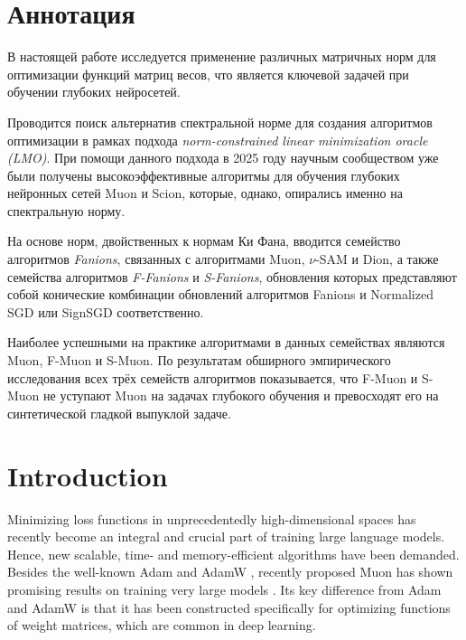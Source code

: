 \documentclass[a4paper,14pt,oneside]{extarticle}
\begin{document}
\newpage
\section*{Аннотация}

В настоящей работе исследуется применение различных матричных норм для оптимизации функций матриц весов, что является ключевой задачей при обучении глубоких нейросетей.

Проводится поиск альтернатив спектральной норме для создания алгоритмов оптимизации в рамках подхода \emph{norm-constrained linear minimization oracle (LMO)}. При помощи данного подхода в 2025 году научным сообществом уже были получены высокоэффективные алгоритмы для обучения глубоких нейронных сетей Muon и Scion, которые, однако, опирались именно на спектральную норму.

На основе норм, двойственных к нормам Ки Фана, вводится семейство алгоритмов \emph{Fanions}, связанных с алгоритмами Muon, $\nu$-SAM и Dion, а также семейства алгоритмов \emph{F-Fanions} и \emph{S-Fanions}, обновления которых представляют собой конические комбинации обновлений алгоритмов Fanions и Normalized SGD или SignSGD соответственно.

Наиболее успешными на практике алгоритмами в данных семействах являются Muon, F-Muon и S-Muon. По результатам обширного эмпирического исследования всех трёх семейств алгоритмов показывается, что F-Muon и S-Muon не уступают Muon на задачах глубокого обучения и превосходят его на синтетической гладкой выпуклой задаче.

\newpage
\begingroup
\hypersetup{linkcolor=black}
\tableofcontents
\endgroup
\clearpage

\section*{Introduction}
Minimizing loss functions in unprecedentedly high-dimensional spaces has recently become an integral and crucial part of training large language models. Hence, new scalable, time- and memory-efficient algorithms have been demanded. Besides the well-known Adam \citep{kingma2014adam} and AdamW \citep{loshchilov2017decoupled}, recently proposed Muon \citep{jordan2024muon} has shown promising results on training very large models \citep{liu2025muonscalablellmtraining}. Its key difference from Adam and AdamW is that it has been constructed specifically for optimizing functions of weight matrices, which are common in deep learning.
\end{document}
